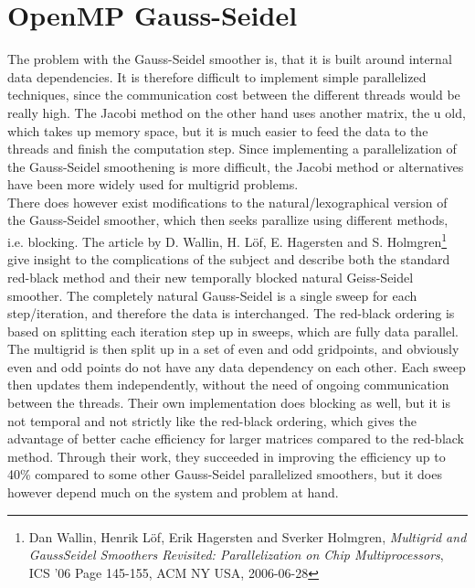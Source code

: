\section{OpenMP Gauss-Seidel}
The problem with the Gauss-Seidel smoother is, that it is built around internal data dependencies. It is therefore difficult to implement simple parallelized techniques, since the communication cost between the different threads would be really high. The Jacobi method on the other hand uses another matrix, the u old, which takes up memory space, but it is much easier to feed the data to the threads and finish the computation step. Since implementing a parallelization of the Gauss-Seidel smoothening is more difficult, the Jacobi method or alternatives have been more widely used for multigrid problems.\\

There does however exist modifications to the natural/lexographical version of the Gauss-Seidel smoother, which then seeks parallize using different methods, i.e. blocking. The article by D. Wallin, H. L\"{o}f, E. Hagersten and S. Holmgren\footnote{Dan Wallin, Henrik L\"{o}f, Erik Hagersten and Sverker Holmgren, \textit{Multigrid and GaussSeidel
Smoothers Revisited:
Parallelization on Chip Multiprocessors}, ICS '06 Page 145-155, ACM NY USA, 2006-06-28}  give insight to the complications of the subject and describe both the standard red-black method and their new temporally blocked natural Geiss-Seidel smoother. The completely natural Gauss-Seidel is a single sweep for each step/iteration, and therefore the data is interchanged. The red-black ordering is based on splitting each iteration step up in sweeps, which are fully data parallel. The multigrid is then split up in a set of even and odd gridpoints, and obviously even and odd points do not have any data dependency on each other. Each sweep then updates them independently, without the need of ongoing communication between the threads. Their own implementation does blocking as well, but it is not temporal and not strictly like the red-black ordering, which gives the advantage of better cache efficiency for larger matrices compared to the red-black method. Through their work, they succeeded in improving the efficiency up to 40\% compared to some other Gauss-Seidel parallelized smoothers, but it does however depend much on the system and problem at hand.\\


